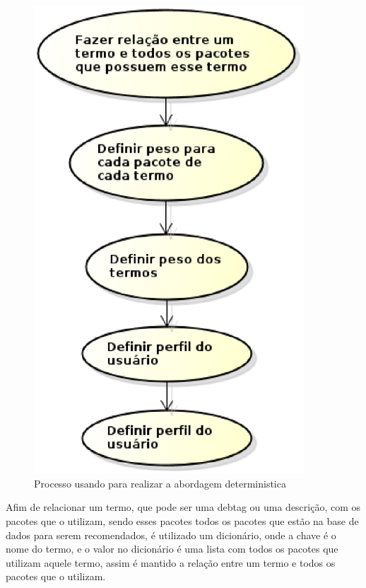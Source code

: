 \begin{figure}[h]
  \centering
  \includegraphics[width=0.9\textwidth]{figuras/abordagem_deterministica.eps}
  \caption{Processo usando para realizar a abordagem deterministica}
  \label{fig:abordatem_deterministica}
\end{figure}

Afim de relacionar um termo, que pode ser uma debtag ou uma descrição, com
os pacotes que o utilizam, sendo esses pacotes todos os pacotes que estão
na base de dados para serem recomendados, é utilizado um dicionário, onde
a chave é o nome do termo, e o valor no dicionário é uma lista com todos os
pacotes que utilizam aquele termo, assim é mantido a relação entre um termo
e todos os pacotes que o utilizam.


